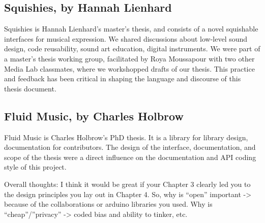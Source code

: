 \subsection{Squishies, by Hannah Lienhard}

Squishies is Hannah Lienhard's master's thesis, and consists of a novel squishable interfaces for musical expression. We shared discussions about low-level sound design, code reusability, sound art education, digital instruments. We were part of a master's thesis working group, facilitated by Roya Moussapour with two other Media Lab classmates, where we workshopped drafts of our thesis. This practice and feedback has been critical in shaping the language and discourse of this thesis document.

\subsection{Fluid Music, by Charles Holbrow}

Fluid Music is Charles Holbrow's PhD thesis. It is a library for library design, documentation for contributors. The design of the interface, documentation, and scope of the thesis were a direct influence on the documentation and API coding style of this project.

Overall thoughts: I think it would be great if your Chapter 3 clearly led you to the design principles you lay out in Chapter 4. So, why is “open” important -> because of the collaborations or arduino libraries you used. Why is “cheap”/”privacy” -> coded bias and ability to tinker, etc.
